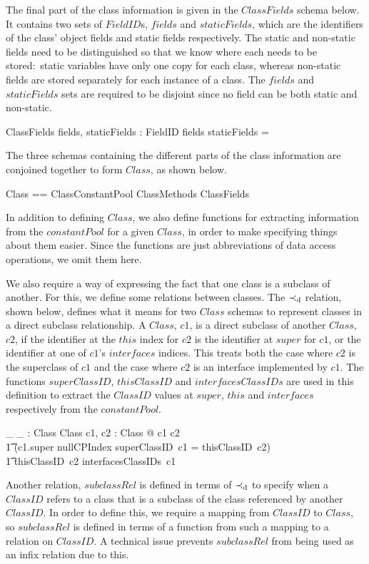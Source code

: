 The final part of the class information is given in the $ClassFields$
schema below.
It contains two sets of $FieldID$s, $fields$ and $staticFields$, which
are the identifiers of the class' object fields and static fields
respectively.
The static and non-static fields need to be distinguished so that we
know where each needs to be stored:~static variables have only one
copy for each class, whereas non-static fields are stored separately
for each instance of a class.
The $fields$ and $staticFields$ sets are required to be disjoint since
no field can be both static and non-static.
\begin{schema}{ClassFields}
  fields, staticFields : \finset FieldID
\where
  fields \cap staticFields = \emptyset
\end{schema}

The three schemas containing the different parts of the class
information are conjoined together to form $Class$, as shown below.
\begin{zed}
  Class == ClassConstantPool \land ClassMethods \land ClassFields
\end{zed}

In addition to defining $Class$, we also define functions for
extracting information from the $constantPool$ for a given $Class$, in
order to make specifying things about them easier.
Since the functions are just abbreviations of data access operations,
we omit them here.

We also require a way of expressing the fact that one class is a
subclass of another.
For this, we define some relations between classes.
The $\prec_{\mathrm{d}}$ relation, shown below, defines what it means for
two $Class$ schemas to represent classes in a direct subclass
relationship.
A $Class$, $c1$, is a direct subclass of another $Class$, $c2$, if the
identifier at the $this$ index for $c2$ is the identifier at $super$
for $c1$, or the identifier at one of $c1$'s $interfaces$ indices.
This treats both the case where $c2$ is the superclass of $c1$ and the
case where $c2$ is an interface implemented by $c1$.
The functions $superClassID$, $thisClassID$ and $interfacesClassIDs$
are used in this definition to extract the $ClassID$ values at
$super$, $this$ and $interfaces$ respectively from the $constantPool$.
\begin{axdef}
  \_ \directsubclass \_ : Class \rel Class
  \where
  \forall c1, c2 : Class @ c1 \directsubclass c2 \iff {} \\
  \t1 (c1.super \neq nullCPIndex \land superClassID~c1 = thisClassID~c2) \\
  \t1 {} \lor thisClassID~c2 \in interfacesClassIDs~c1
\end{axdef}
Another relation, $subclassRel$ is defined in terms of
$\prec_{\mathrm{d}}$ to specify when a $ClassID$ refers to a class that
is a subclass of the class referenced by another $ClassID$.
In order to define this, we require a mapping from $ClassID$ to
$Class$, so $subclassRel$ is defined in terms of a function from such
a mapping to a relation on $ClassID$.
A technical issue prevents $subclassRel$ from being used as an infix
relation due to this.

